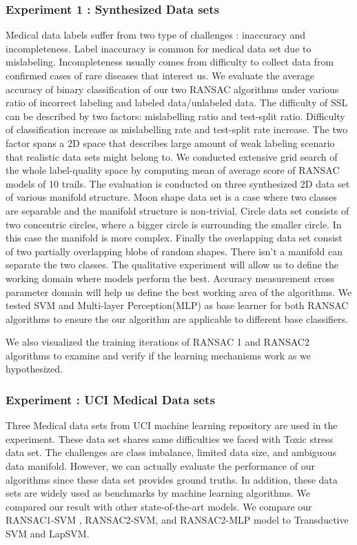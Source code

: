 \documentclass[a4paper, times, 12pt, ,onecolumn,oneside,top=1.0cm,bottom=1.0cm,left=1.0 cm,right=1cm]{article}
\begin{document}
\subsubsection{Experiment 1 : Synthesized Data sets}
Medical data labels suffer from two type of challenges : inaccuracy and incompleteness. Label inaccuracy is common for medical data set due to mislabeling. Incompleteness usually comes from difficulty to collect data from confirmed cases of rare diseases that interest us. We evaluate the average accuracy of binary classification of our two RANSAC algorithms under various ratio of incorrect labeling and labeled data/unlabeled data. The difficulty of SSL can be described by two factors: mislabelling ratio and test-split ratio. Difficulty of classification increase as mislabelling rate and test-split rate increase. The two factor spans a 2D space that describes large amount of weak labeling scenario that realistic data sets might belong to. We conducted extensive grid search of the whole label-quality space by computing mean of average score of RANSAC models of 10 trails. The evaluation is conducted on three synthesized 2D data set of various manifold structure. Moon shape data set is a case where two classes are separable and the manifold structure is non-trivial. Circle data set consists of two concentric circles, where a bigger circle is surrounding the smaller circle. In this case the manifold is more complex. Finally the overlapping data set consist of two partially overlapping blobs of random shapes. There isn't a manifold can separate the two classes. The qualitative experiment will allow us to define the working domain where models perform the best. Accuracy measurement cross parameter domain will help us define the best working area of the algorithms. We tested SVM and Multi-layer Perception(MLP) as base learner for both RANSAC algorithms to ensure the our algorithm are applicable to different base classifiers.

We also visualized the training iterations of RANSAC 1 and RANSAC2 algorithms to examine and verify if the learning mechanisms work as we hypothesized. 

\subsubsection{Experiment  : UCI Medical Data sets}
Three Medical data sets from UCI machine learning repository are used in the experiment.  These data set shares same difficulties we faced with Toxic stress data set. The challenges are class imbalance, limited data size, and ambiguous data manifold. However, we can actually evaluate the performance of our algorithms since these data set provides ground truths. In addition, these data sets are widely used as benchmarks by machine learning algorithms. We compared our result with other state-of-the-art models. We compare our RANSAC1-SVM , RANSAC2-SVM, and RANSAC2-MLP model to Transductive SVM and LapSVM. 
\end{document}
